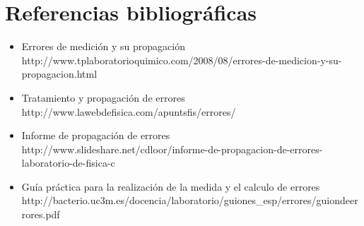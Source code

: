 \documentclass[letter,11pt]{article}
\begin{document}
\section{Referencias bibliográficas}
\begin{itemize}
\item Errores de medición y su propagación \\
http://www.tplaboratorioquimico.com/2008/08/errores-de-medicion-y-su-propagacion.html
\item Tratamiento y propagación de errores \\
http://www.lawebdefisica.com/apuntsfis/errores/
\item Informe de propagación de errores \\
http://www.slideshare.net/cdloor/informe-de-propagacion-de-errores-laboratorio-de-fisica-c
\item Guía práctica para la realización de la medida y el calculo de errores \\
http://bacterio.uc3m.es/docencia/laboratorio/guiones\_esp/errores/guiondeerrores.pdf
\end{itemize}
\end{document}
